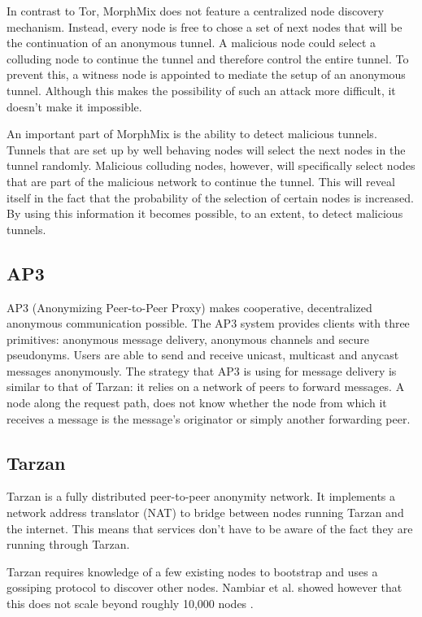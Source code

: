 \documentclass{article}
\begin{document}
		In contrast to Tor, MorphMix does not feature a centralized node discovery mechanism. Instead, every node is free to chose a set of next nodes that will be the continuation of an anonymous tunnel. A malicious node could select a colluding node to continue the tunnel and therefore control the entire tunnel. To prevent this, a witness node is appointed to mediate the setup of an anonymous tunnel. Although this makes the possibility of such an attack more difficult, it doesn't make it impossible.
		
		An important part of MorphMix is the ability to detect malicious tunnels. Tunnels that are set up by well behaving nodes will select the next nodes in the tunnel randomly. Malicious colluding nodes, however, will specifically select nodes that are part of the malicious network to continue the tunnel. This will reveal itself in the fact that the probability of the selection of certain nodes is increased. By using this information it becomes possible, to an extent, to detect malicious tunnels.
		
			\subsection{AP3} %
		AP3 (Anonymizing Peer-to-Peer Proxy) \cite{mislove2004ap3} makes cooperative, decentralized anonymous communication possible. The AP3 system provides clients with three primitives: anonymous message delivery, anonymous channels and secure pseudonyms. Users are able to send and receive unicast, multicast and anycast messages anonymously. The strategy that AP3 is using for message delivery is similar to that of Tarzan: it relies on a network of peers to forward messages. A node along the request path, does not know whether the node from which it receives a message is the message's originator or simply another forwarding peer.
		
	\subsection{Tarzan} %
		Tarzan \cite{freedman2002tarzan} is a fully distributed peer-to-peer anonymity network. It implements a network address translator (NAT) to bridge between nodes running Tarzan and the internet. This means that services don't have to be aware of the fact they are running through Tarzan.
		
		Tarzan requires knowledge of a few existing nodes to bootstrap and uses a gossiping protocol to discover other nodes. Nambiar et al. showed however that this does not scale beyond roughly 10,000 nodes \cite{panchenko2009nisan, nambiar2006salsa}.
		
\end{document}
